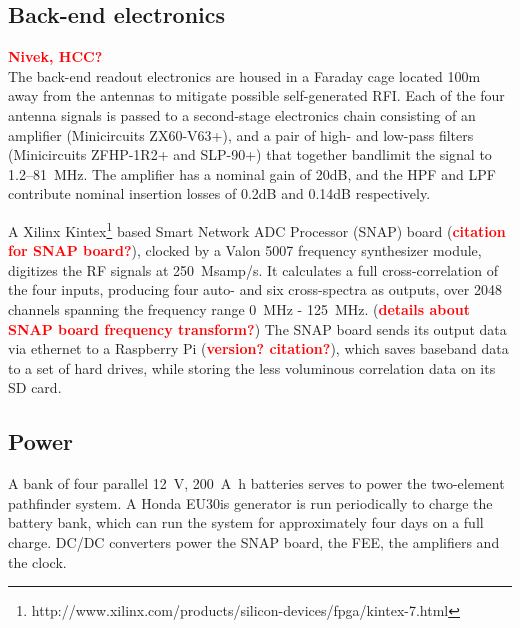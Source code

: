 \documentclass{ws-jai}
\def\prizm{PRI$^{\rm Z}$M}
\newcommand{\attention}[1]{\textcolor{red}{\bf {#1}}}
\begin{document}
\fi

\subsection{Back-end electronics}
\attention{Nivek, HCC?} \\

The back-end readout electronics are housed in a Faraday cage
located 100m away from the antennas to mitigate possible
self-generated RFI.  Each of the four antenna
signals is passed to a second-stage electronics chain consisting of 
an
amplifier (Minicircuits
ZX60-V63+), and a pair of high- and low-pass filters (Minicircuits
ZFHP-1R2+ and SLP-90+) that together  bandlimit the signal to
1.2--\SI{81}{MHz}.  The amplifier has a nominal gain of 20dB, and the HPF and LPF contribute nominal insertion losses of 0.2dB and 0.14dB respectively.

A Xilinx Kintex\footnote{http://www.xilinx.com/products/silicon-devices/fpga/kintex-7.html} based Smart Network ADC Processor (SNAP) board (\attention{citation for SNAP board?}), 
clocked by a Valon 5007 frequency synthesizer module,
digitizes the RF signals at 250~Msamp/s. It calculates a full
cross-correlation of the four inputs, producing four auto- and six
cross-spectra as outputs, over 2048 channels spanning the frequency range 
\SI{0}{MHz} - \SI{125}{MHz}. 
(\attention{details about SNAP board frequency transform?})
The SNAP board sends its output data via ethernet to a Raspberry Pi (\attention{version? citation?}), which saves baseband data to a set of hard drives, while storing the less voluminous correlation data on its SD card.

\subsection{Power}

A bank of four parallel \SI{12}{V}, \SI{200}{\ampere\hour} batteries serves to power the two-element pathfinder system. A Honda EU30is generator is run periodically to charge the battery bank, which can run the system for approximately four days on a full charge.  DC/DC converters power the SNAP board, the FEE, the amplifiers and the clock.
\end{document}
